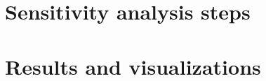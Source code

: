 \section{Sensitivity analysis steps} \label{sec:ch4_steps}



\section{Results and visualizations} \label{sec:ch4_res}